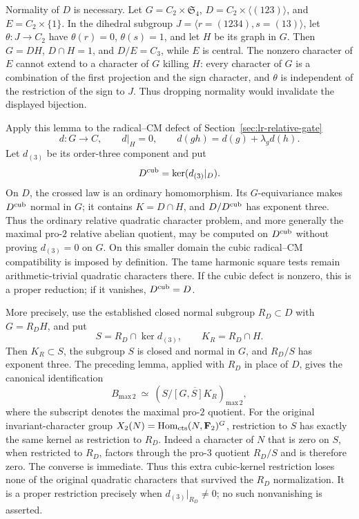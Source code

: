 Normality of $D$ is necessary. Let $G=C_2\times\mathfrak S_4$,
$D=C_2\times\langle(123)\rangle$, and $E=C_2\times\{1\}$.
In the dihedral subgroup $J=\langle r=(1234),s=(13)\rangle$,
let $\theta:J\to C_2$ have $\theta(r)=0$, $\theta(s)=1$,
and let $H$ be its graph in $G$. Then $G=DH$, $D\cap H=1$,
and $D/E=C_3$, while $E$ is central. The nonzero character of
$E$ cannot extend to a character of $G$ killing $H$:
every character of $G$ is a combination of the first projection
and the sign character, and $\theta$ is independent of the
restriction of the sign to $J$. Thus dropping normality would
invalidate the displayed bijection.

Apply this lemma to the radical--CM defect of
Section~\ref{sec:lr-relative-gate}
\[
 d:G\longrightarrow C,\qquad d|_H=0,\qquad
 d(gh)=d(g)+\lambda_gd(h).
\]
Let \(d_{(3)}\) be its order-three component and put
\[
                  D^{\rm cub}=\ker(d_{(3)}|_D).
\]
On \(D\), the crossed law is an ordinary homomorphism.
Its \(G\)-equivariance makes \(D^{\rm cub}\) normal in \(G\);
it contains \(K=D\cap H\), and \(D/D^{\rm cub}\) has
exponent three. Thus the ordinary relative quadratic
character problem, and more generally the maximal
pro-\(2\) relative abelian quotient, may be computed on
\(D^{\rm cub}\) without proving \(d_{(3)}=0\) on \(G\).
On this smaller domain the cubic radical--CM compatibility
is imposed by definition. The tame harmonic square tests
remain arithmetic-trivial quadratic characters there.
If the cubic defect is nonzero, this is a proper reduction;
if it vanishes, \(D^{\rm cub}=D\).

More precisely, use the established closed normal subgroup
\(R_D\subset D\) with \(G=R_DH\), and put
\[
 S=R_D\cap\ker d_{(3)},\qquad K_R=R_D\cap H.
\]
Then \(K_R\subset S\), the subgroup \(S\) is closed and normal
in \(G\), and \(R_D/S\) has exponent three. The preceding
lemma, applied with \(R_D\) in place of \(D\), gives the
canonical identification
\[
 B_{\mathrm{max}\,2}\ \simeq\
 \left(S/\overline{[G,S]K_R}\right)_{\mathrm{max}\,2},
\]
where the subscript denotes the maximal pro-\(2\) quotient.
For the original invariant-character group
\(X_2(N)=\operatorname{Hom}_{\rm cts}(N,\mathbf F_2)^G\),
restriction to \(S\) has exactly the same kernel as
restriction to \(R_D\). Indeed a character of \(N\) that is
zero on \(S\), when restricted to \(R_D\), factors through
the pro-\(3\) quotient \(R_D/S\) and is therefore zero.
The converse is immediate. Thus this extra cubic-kernel
restriction loses none of the original quadratic characters
that survived the \(R_D\) normalization.
It is a proper restriction precisely when
\(d_{(3)}|_{R_D}\ne0\); no such nonvanishing is asserted.
